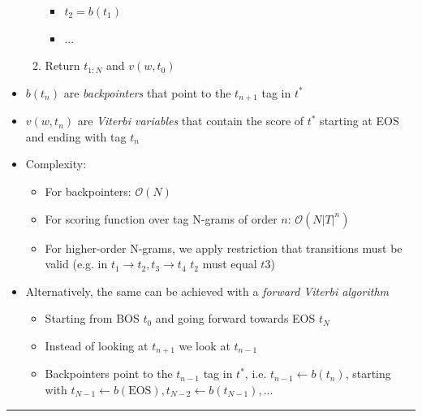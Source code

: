 \begin{itemize}
\begin{enumerate}
\begin{itemize}
            \item $t_2 = b(t_1)$
            \item $...$
        \end{itemize}
        \item Return $t_{1:N}$ and $v(w, t_0)$
    \end{enumerate}
    \item $b(t_n)$ are \emph{backpointers} that point to the $t_{n+1}$ tag in $t^*$
    \item $v(w, t_n)$ are \emph{Viterbi variables} that contain the score of $t^*$ starting at EOS and ending with tag $t_n$ 
    \item Complexity:
    \begin{itemize}
        \item For backpointers: $\mathcal{O}(N)$
        \item For scoring function over tag N-grams of order $n$: $\mathcal{O}(N |T|^n)$ 
        \item For higher-order N-grams, we apply restriction that transitions must be valid (e.g. in $t_1 \to t_2, t_3 \to t_4$ $t_2$ must equal $t3$)
    \end{itemize}
    \item Alternatively, the same can be achieved with a \emph{forward Viterbi algorithm}
    \begin{itemize}
        \item Starting from BOS $t_0$ and going forward towards EOS $t_N$
        \item Instead of looking at $t_{n+1}$ we look at $t_{n-1}$
        \item Backpointers point to the $t_{n-1}$ tag in $t^*$, i.e. $t_{n-1} \gets b(t_n)$, starting with $t_{N-1} \gets b(\textrm{EOS}), t_{N-2} \gets b(t_{N-1}),...$
    \end{itemize}
\end{itemize}

{\color{lightgray}\hrule height 0.001mm}

